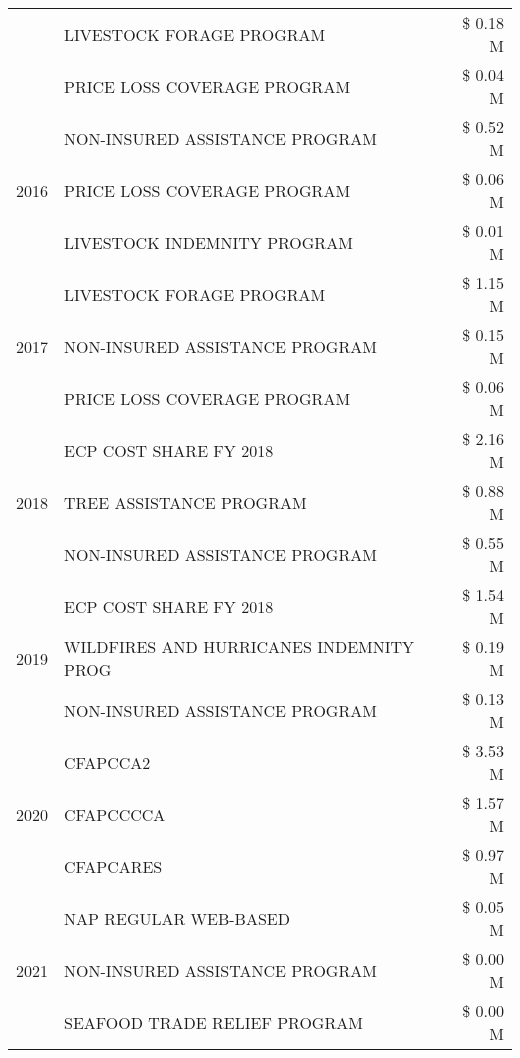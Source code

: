 \begin{tabular}{llr}
 & LIVESTOCK FORAGE PROGRAM & \$ 0.18 M \\
 & PRICE LOSS COVERAGE PROGRAM & \$ 0.04 M \\
\cline{1-3}
\multirow[t]{3}{*}{2016} & NON-INSURED ASSISTANCE PROGRAM                & \$ 0.52 M \\
 & PRICE LOSS COVERAGE PROGRAM                   & \$ 0.06 M \\
 & LIVESTOCK INDEMNITY PROGRAM                   & \$ 0.01 M \\
\cline{1-3}
\multirow[t]{3}{*}{2017} & LIVESTOCK FORAGE PROGRAM & \$ 1.15 M \\
 & NON-INSURED ASSISTANCE PROGRAM & \$ 0.15 M \\
 & PRICE LOSS COVERAGE PROGRAM & \$ 0.06 M \\
\cline{1-3}
\multirow[t]{3}{*}{2018} & ECP COST SHARE FY 2018 & \$ 2.16 M \\
 & TREE ASSISTANCE PROGRAM & \$ 0.88 M \\
 & NON-INSURED ASSISTANCE PROGRAM & \$ 0.55 M \\
\cline{1-3}
\multirow[t]{3}{*}{2019} & ECP COST SHARE FY 2018 & \$ 1.54 M \\
 & WILDFIRES AND HURRICANES INDEMNITY PROG & \$ 0.19 M \\
 & NON-INSURED ASSISTANCE PROGRAM & \$ 0.13 M \\
\cline{1-3}
\multirow[t]{3}{*}{2020} & CFAPCCA2 & \$ 3.53 M \\
 & CFAPCCCCA & \$ 1.57 M \\
 & CFAPCARES & \$ 0.97 M \\
\cline{1-3}
\multirow[t]{3}{*}{2021} & NAP REGULAR WEB-BASED & \$ 0.05 M \\
 & NON-INSURED ASSISTANCE PROGRAM & \$ 0.00 M \\
 & SEAFOOD TRADE RELIEF PROGRAM & \$ 0.00 M \\
\cline{1-3}
\bottomrule
\end{tabular}
